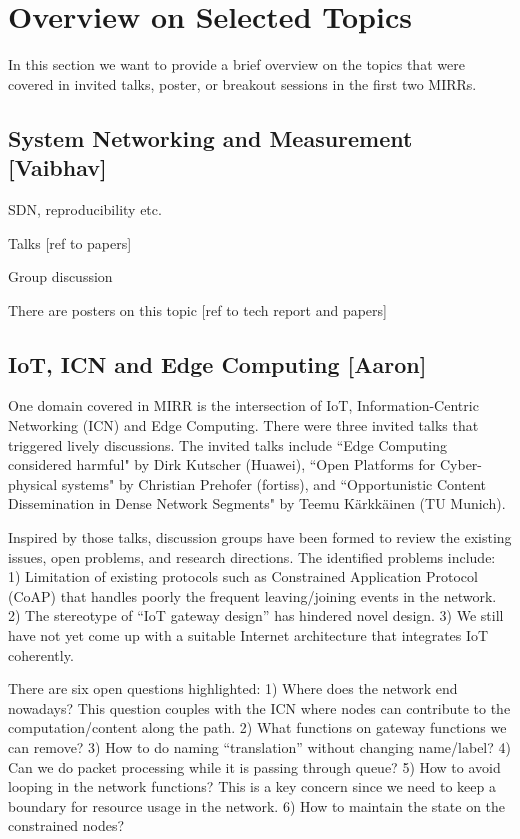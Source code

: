 \section{Overview on Selected Topics} \label{sec:content}

In this section we want to provide a brief overview on the topics that were covered in invited talks, poster, or breakout sessions in the first two MIRRs.


\subsection{System Networking and Measurement [Vaibhav]}

SDN, reproducibility etc.

Talks [ref to papers]

Group discussion

There are posters on this topic [ref to tech report and papers]


\subsection{IoT, ICN and Edge Computing [Aaron]}

One domain covered in MIRR is the intersection of IoT, Information-Centric
Networking (ICN) and Edge Computing. There were three invited talks that triggered
lively discussions. The invited talks include
``Edge Computing considered harmful" by Dirk Kutscher (Huawei),
``Open Platforms for Cyber-physical systems" by Christian Prehofer (fortiss),
and ``Opportunistic Content Dissemination in Dense Network Segments"
by Teemu Kärkkäinen (TU Munich).

Inspired by those talks, discussion groups
have been formed to review the existing issues, open problems, and
research directions. The identified problems include: 1) Limitation
of existing protocols such as Constrained Application Protocol (CoAP) that
handles poorly the frequent leaving/joining events in the network. 2) The
stereotype of ``IoT gateway design'' has hindered novel design. 3) We still
have not yet come up with a suitable Internet architecture that integrates
IoT coherently.

There are six open questions highlighted: 1) Where does the network
end nowadays? This question couples
with the ICN where nodes can contribute to the computation/content along
the path. 2) What functions on gateway functions we can remove? 3) How to do
naming ``translation'' without changing name/label? 4) Can we do packet
processing while it is passing through queue? 5) How to avoid looping in
the network functions? This is a key concern since we need to keep a
boundary for resource usage in the network. 6) How to maintain the state on
the constrained nodes?

